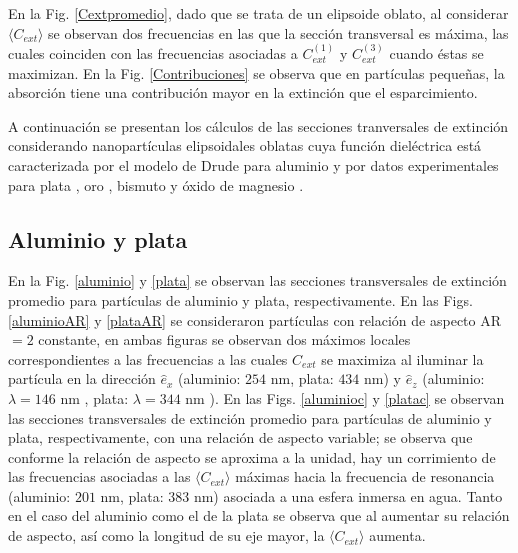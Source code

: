  En la Fig. \ref{Cextpromedio}, dado que se trata de un elipsoide oblato, al considerar $\langle C_{ext}\rangle$ se observan dos frecuencias en las que la sección transversal es máxima, las cuales coinciden con las frecuencias asociadas a $C_{ext}^{(1)}$ y $C_{ext}^{(3)}$ cuando éstas se maximizan. En la Fig. \ref{Contribuciones} se observa que en partículas pequeñas, la absorción tiene una contribución mayor en la extinción que el esparcimiento.

A continuación se presentan los cálculos de las secciones tranversales de extinción considerando nanopartículas elipsoidales oblatas cuya función dieléctrica está caracterizada por el modelo de Drude para aluminio \cite{Aluminio} y por datos experimentales para plata \cite{Plata}, oro \cite{Plata}, bismuto \cite{Bismuto} y  óxido de magnesio \cite{MgO}.



\subsection*{Aluminio y plata}
En la Fig. \ref{aluminio} y \ref{plata} se observan las secciones transversales de extinción promedio para partículas de aluminio y plata, respectivamente. En las Figs. \ref{aluminioAR} y \ref{plataAR} se consideraron partículas con relación de aspecto AR$=2$ constante, en ambas figuras se observan dos máximos locales correspondientes a las frecuencias a las cuales $C_{ext}$ se maximiza al iluminar la partícula en la dirección $\hat{e}_x$ (aluminio: $254\text{ nm}$, plata: $434\text{ nm}$) y $\hat{e}_z$ (aluminio: $\lambda=146\text{ nm}$ , plata: $\lambda=344\text{ nm}$ ).  En las Figs. \ref{aluminioc}  y \ref{platac} se observan las secciones transversales de extinción promedio para partículas de aluminio y plata, respectivamente, con una relación de aspecto variable; se observa que conforme la relación de aspecto se aproxima a la unidad, hay un corrimiento de las frecuencias asociadas a las $\langle C_{ext}\rangle$ máximas hacia la frecuencia de resonancia (aluminio: $201\text{ nm}$, plata: $383\text{ nm}$) asociada a una esfera  inmersa en agua. Tanto en el caso del aluminio como el de la plata se observa que al aumentar su relación de aspecto, así como la longitud de su eje mayor, la $\langle C_{ext}\rangle$ aumenta.


